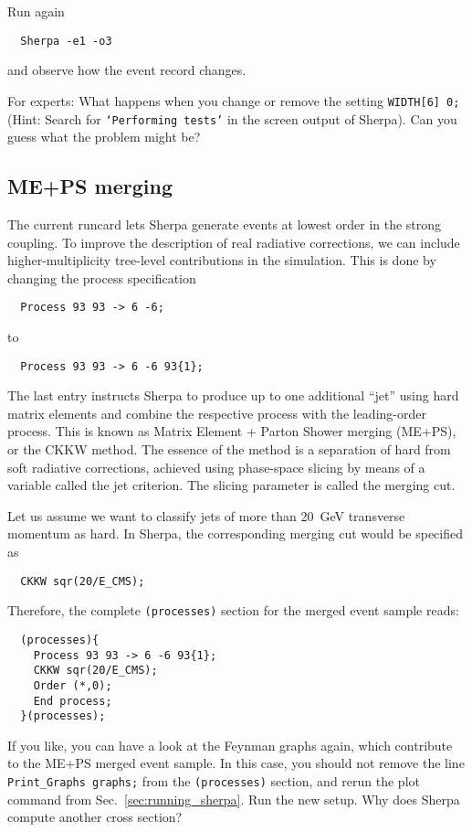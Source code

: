 \documentclass[10pt]{article}
\begin{document}
Run again 
\begin{verbatim}
  Sherpa -e1 -o3
\end{verbatim}
and observe how the event record changes.

For experts: What happens when you change or remove the setting {\tt WIDTH[6] 0;}
(Hint: Search for {\tt `Performing tests'} in the screen output of Sherpa).
Can you guess what the problem might be?

\subsection{ME+PS merging}

The current runcard lets Sherpa generate events at lowest order in the strong coupling.
To improve the description of real radiative corrections, we can include higher-multiplicity
tree-level contributions in the simulation. This is done by changing the process specification

\begin{verbatim}
  Process 93 93 -> 6 -6;
\end{verbatim}
to
\begin{verbatim}
  Process 93 93 -> 6 -6 93{1};
\end{verbatim}
The last entry instructs Sherpa to produce up to one additional ``jet'' using
hard matrix elements and combine the respective process with the leading-order process.
This is known as Matrix Element + Parton Shower merging (ME+PS), or the CKKW method.
The essence of the method is a separation of hard from soft radiative corrections,
achieved using phase-space slicing by means of a variable called the jet criterion. The slicing parameter is called the merging cut.

Let us assume we want to classify jets of more than 20~GeV transverse momentum as hard.
In Sherpa, the corresponding merging cut would be specified as
\begin{verbatim}
  CKKW sqr(20/E_CMS);
\end{verbatim}
Therefore, the complete {\tt (processes)} section for the merged event sample reads:
\begin{verbatim}
  (processes){
    Process 93 93 -> 6 -6 93{1};
    CKKW sqr(20/E_CMS);
    Order (*,0);
    End process;
  }(processes);
\end{verbatim}
If you like, you can have a look at the Feynman graphs again, which contribute
to the ME+PS merged event sample. In this case, you should not remove the line
{\tt Print\_Graphs graphs;} from the {\tt (processes)} section, and rerun the 
plot command from Sec.~\ref{sec:running_sherpa}.
%
Run the new setup. Why does Sherpa compute another cross section?
\end{document}
